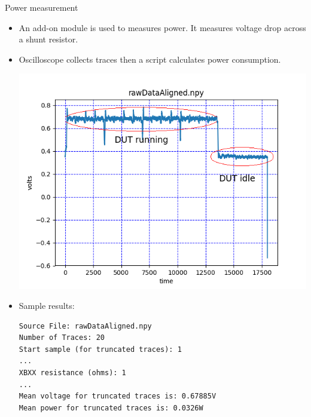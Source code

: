 \documentclass[xcolor=pdftex,dvipsnames,table,final]{beamer}
\begin{document}
\begin{frame}[fragile]{}
\begin{columns}[t]
\begin{column}{.31\linewidth}
      \begin{block}{Power measurement}
         \vspace{-1ex}
         \begin{itemize}
          \item An add-on module is used to measures power. It measures voltage drop across a shunt resistor.
          \item Oscilloscope collects traces then a script calculates power consumption.
        \begin{center}
          \includegraphics[scale=0.8]{images/power.png}
        \end{center}
        \item Sample results:


\begin{Verbatim}[fontsize=\small]
Source File: rawDataAligned.npy
Number of Traces: 20
Start sample (for truncated traces): 1
...
XBXX resistance (ohms): 1
...
Mean voltage for truncated traces is: 0.67885V
Mean power for truncated traces is: 0.0326W
\end{Verbatim}
         \end{itemize}



\end{block}
\end{column}
\end{columns}
\end{frame}
\end{document}
